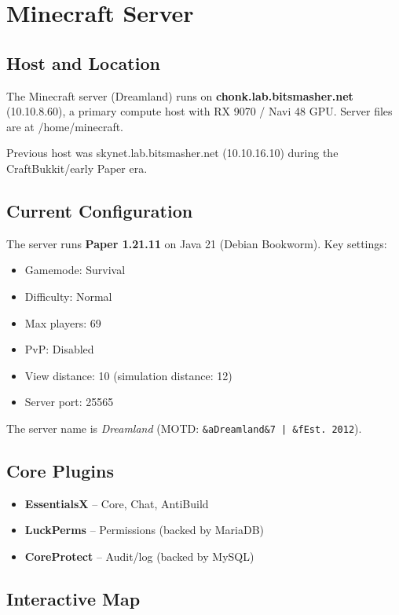 \section{Minecraft Server}

\subsection{Host and Location}

The Minecraft server (Dreamland) runs on \textbf{chonk.lab.bitsmasher.net} (10.10.8.60), a primary compute host with RX 9070 / Navi 48 GPU. Server files are at /home/minecraft.

Previous host was skynet.lab.bitsmasher.net (10.10.16.10) during the CraftBukkit/early Paper era.

\subsection{Current Configuration}

The server runs \textbf{Paper 1.21.11} on Java 21 (Debian Bookworm). Key settings:
\begin{itemize}
    \item Gamemode: Survival
    \item Difficulty: Normal
    \item Max players: 69
    \item PvP: Disabled
    \item View distance: 10 (simulation distance: 12)
    \item Server port: 25565
\end{itemize}

The server name is \textit{Dreamland} (MOTD: \texttt{\&aDreamland\&7 | \&fEst. 2012}).

\subsection{Core Plugins}

\begin{itemize}
    \item \textbf{EssentialsX} -- Core, Chat, AntiBuild
    \item \textbf{LuckPerms} -- Permissions (backed by MariaDB)
    \item \textbf{CoreProtect} -- Audit/log (backed by MySQL)
\end{itemize}

\subsection{Interactive Map}

